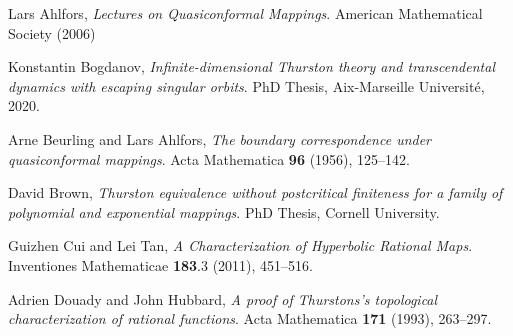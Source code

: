 \documentclass[10pt,reqno,a4paper]{amsart}
\numberwithin{figure}{section}
\numberwithin{equation}{section}
\begin{document}
\begin{thebibliography}{RSSS}
	
	 Lars Ahlfors, \emph{Lectures on Quasiconformal Mappings}. American Mathematical Society (2006)
	
	 Konstantin Bogdanov, \emph{Infinite-dimensional Thurston theory and transcendental dynamics with escaping singular orbits}. PhD Thesis, Aix-Marseille Universit\'e, 2020.
	
	
	 Arne Beurling and Lars Ahlfors, \emph{The boundary correspondence under quasiconformal mappings}. Acta Mathematica \textbf{96} (1956), 125–142.
	
%	
%	
	David Brown, 
	\emph{Thurston equivalence without postcritical finiteness for a family of polynomial and exponential mappings}. PhD Thesis, Cornell University.
	
	
	
	Guizhen Cui and Lei Tan, \emph{A Characterization of Hyperbolic Rational Maps}. Inventiones Mathematicae \textbf{183}.3 (2011), 451--516.
	
	Adrien Douady and John Hubbard, \emph{A proof of Thurstons's topological characterization of rational functions}. Acta Mathematica \textbf{171} (1993), 263--297.
	
%	
%	
%	
%	
	

\end{thebibliography}
\end{document}

